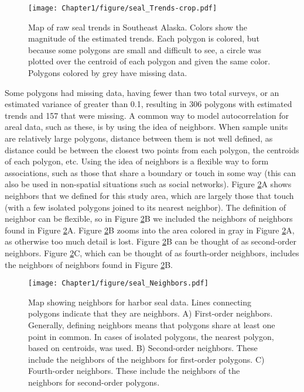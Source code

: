 %
\begin{figure}
\begin{center}
\texttt{[image: Chapter1/figure/seal\_Trends-crop.pdf]}
\caption{Map of raw seal trends in Southeast Alaska.  Colors show the magnitude of the estimated trends.  Each polygon is colored, but because some polygons are small and difficult to see, a circle was plotted over the centroid of each polygon and given the same color. Polygons colored by grey have missing data.
\label{fig:sealTrends}}
\end{center}
\end{figure}
%
Some polygons had missing data, having fewer than two total surveys, or an estimated variance of greater than 0.1, resulting in 306 polygons with estimated trends and 157 that were missing. A common way to model autocorrelation for areal data, such as these, is by using the idea of neighbors. When sample units are relatively large polygons, distance between them is not well defined, as distance could be between the closest two points from each polygon, the centroids of each polygon, etc.  Using the idea of neighbors is a flexible way to form associations, such as those that share a boundary or touch in some way (this can also be used in non-spatial situations such as social networks). Figure \ref{fig:sealNeighbors}A shows neighbors that we defined for this study area, which are largely those that touch (with a few isolated polygons joined to its nearest neighbor). The definition of neighbor can be flexible, so in Figure \ref{fig:sealNeighbors}B we included the neighbors of neighbors found in Figure \ref{fig:sealNeighbors}A.  Figure \ref{fig:sealNeighbors}B zooms into the area colored in gray in Figure \ref{fig:sealNeighbors}A, as otherwise too much detail is lost. Figure \ref{fig:sealNeighbors}B can be thought of as second-order neighbors. Figure \ref{fig:sealNeighbors}C, which can be thought of as fourth-order neighbors, includes the neighbors of neighbors found in Figure \ref{fig:sealNeighbors}B.
\begin{figure}
\begin{center}
\texttt{[image: Chapter1/figure/seal\_Neighbors.pdf]}
\caption{Map showing neighbors for harbor seal data. Lines connecting polygons indicate that they are neighbors.  A) First-order neighbors. Generally, defining neighbors means that polygons share at least one point in common.  In cases of isolated polygons, the nearest polygon, based on centroids, was used. B) Second-order neighbors.  These include the neighbors of the neighbors for first-order polygons.  C) Fourth-order neighbors.  These include the neighbors of the neighbors for second-order polygons.
\label{fig:sealNeighbors}}
\end{center}
\end{figure}

